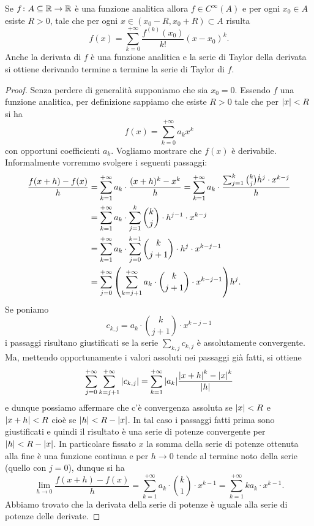 \begin{theorem}
\label{th:48765}%
Se $f\colon A\subseteq {\mathbb R}\to{\mathbb R}$ è una funzione analitica allora
$f\in C^\infty(A)$ e per ogni $x_0\in A$ esiste $R>0$, tale che
per ogni $x \in (x_0-R, x_0+R)\subset A$ risulta
\begin{equation}\label{eq:2344494}
  f(x) = \sum_{k=0}^{+\infty} \frac{f^{(k)}(x_0)}{k!}(x-x_0)^k.
\end{equation}
Anche la derivata di $f$ è una funzione analitica e la serie
di Taylor della derivata si ottiene derivando termine a termine
la serie di Taylor di $f$.
\end{theorem}
%
\begin{proof}
Senza perdere di generalità supponiamo che sia $x_0=0$. 
Essendo $f$
una funzione analitica, per definizione sappiamo che esiste $R>0$
tale che per ${\left|x\right|}<R$ si ha
\[
f(x) = \sum_{k=0}^{+\infty} a_k x^k
\]
con opportuni coefficienti $a_k$. 
Vogliamo mostrare che $f(x)$ è derivabile.
Informalmente vorremmo svolgere i seguenti passaggi:
\begin{align*}
\frac{f(x+h) - f(x)}{h}
&= \sum_{k=1}^{+\infty} a_k \cdot \frac{(x+h)^k-x^k}{h}
= \sum_{k=1}^{+\infty} a_k \cdot \frac{\sum_{j=1}^k {k\choose j} \dot h^j \cdot x^{k-j}}{h} \\
&= \sum_{k=1}^{+\infty} a_k \cdot \sum_{j=1}^k {k\choose j} \cdot h^{j-1} \cdot x^{k-j} \\
&= \sum_{k=1}^{+\infty} a_k \cdot \sum_{j=0}^{k-1} {k\choose j+1} \cdot h^j \cdot x^{k-j-1} \\
&= \sum_{j=0}^{+\infty} {\left( \sum_{k=j+1}^{+\infty} a_k \cdot {k\choose j+1} \cdot x^{k-j-1} \right)} h^j.
\end{align*}
Se poniamo
\[
  c_{k,j} = a_k\cdot {k\choose j+1}\cdot x^{k-j-1}
\]
i passaggi risultano giustificati se la serie $\sum_{k,j} c_{k,j}$
è assolutamente convergente. Ma, mettendo opportunamente
i valori assoluti nei passaggi già fatti, si ottiene
\[
  \sum_{j=0}^{+\infty} \sum_{k=j+1}^{+\infty} {\left|c_{k,j}\right|}
  =  \sum_{k=1}^{+\infty} {\left|a_k\right|} \frac{{\left|x+h\right|}^k-{\left|x\right|}^k}{{\left|h\right|}}
\]
e dunque possiamo affermare che c'è convergenza assoluta
se ${\left|x\right|}<R$ e ${\left|x+h\right|}<R$ cioè se ${\left|h\right|}< R-{\left|x\right|}$. In tal caso
i passaggi fatti prima sono giustificati e quindi il risultato
è una serie di potenze convergente per ${\left|h\right|}<R-{\left|x\right|}$. In particolare
fissato $x$
la somma della serie di potenze ottenuta alla fine è una funzione continua
e per $h\to 0$
tende al termine noto della serie (quello con $j=0$), dunque si ha
\[
  \lim_{h\to 0} \frac{f(x+h)-f(x)}{h}
  = \sum_{k=1}^{+\infty} a_k \cdot {k \choose 1} \cdot x^{k-1}
  = \sum_{k=1}^{+\infty} k a_k \cdot x^{k-1}.
\]
Abbiamo trovato che la derivata della serie di potenze è uguale
alla serie di potenze delle derivate.


\end{proof}
